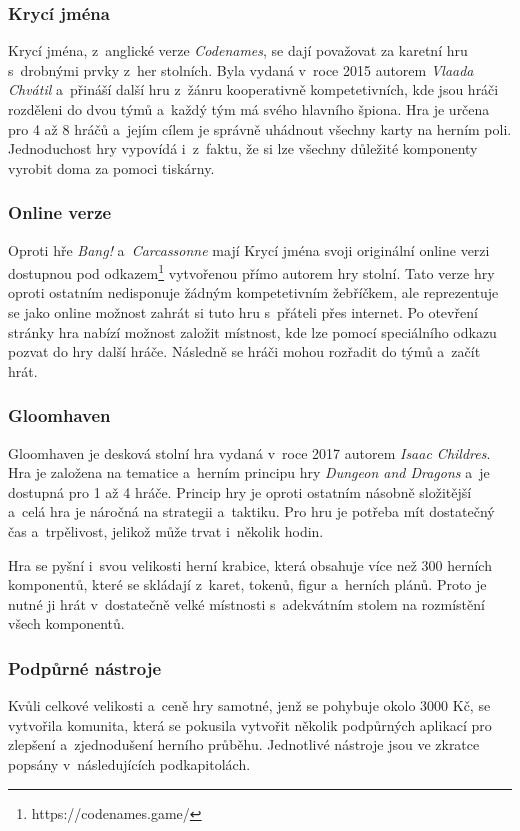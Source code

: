 \subsubsection{Krycí jména}
\label{subsubsec:popular-board-games-analysis-codenames}
Krycí jména, z~anglické verze \textit{Codenames}, se dají považovat za karetní hru s~drobnými prvky z~her stolních. Byla vydaná v~roce 2015 autorem \textit{Vlaada Chvátil} a~přináší další hru z~žánru kooperativně kompetetivních, kde jsou hráči rozděleni do dvou týmů a~každý tým má svého hlavního špiona. Hra je určena pro 4 až 8 hráčů a~jejím cílem je správně uhádnout všechny karty na herním poli. Jednoduchost hry vypovídá i~z~faktu, že si lze všechny důležité komponenty vyrobit doma za pomoci tiskárny.

\subsubsection*{Online verze}
\label{subsubsec:popular-board-games-analysis-codenames-online}
Oproti hře \textit{Bang!} a~\textit{Carcassonne} mají Krycí jména svoji originální online verzi dostupnou pod odkazem\footnote{https://codenames.game/} vytvořenou přímo autorem hry stolní. Tato verze hry oproti ostatním nedisponuje žádným kompetetivním žebříčkem, ale reprezentuje se jako online možnost zahrát si tuto hru s~přáteli přes internet. Po otevření stránky hra nabízí možnost založit místnost, kde lze pomocí speciálního odkazu pozvat do hry další hráče. Následně se hráči mohou rozřadit do týmů a~začít hrát.

\subsubsection{Gloomhaven}
\label{subsubsec:popular-board-games-analysis-gloomhaven}
Gloomhaven je desková stolní hra vydaná v~roce 2017 autorem \textit{Isaac Childres}. Hra je založena na tematice a~herním principu hry \textit{Dungeon and Dragons} a~je dostupná pro 1 až 4 hráče. Princip hry je oproti ostatním násobně složitější a~celá hra je náročná na strategii a~taktiku. Pro hru je potřeba mít dostatečný čas a~trpělivost, jelikož může trvat i~několik hodin.

Hra se pyšní i~svou velikosti herní krabice, která obsahuje více než 300 herních komponentů, které se skládají z~karet, tokenů, figur a~herních plánů. Proto je nutné ji hrát v~dostatečně velké místnosti s~adekvátním stolem na rozmístění všech komponentů.

\subsubsection*{Podpůrné nástroje}
\label{subsubsec:popular-board-games-analysis-gloomhaven-support-tools}
Kvůli celkové velikosti a~ceně hry samotné, jenž se pohybuje okolo 3000 Kč, se vytvořila komunita, která se pokusila vytvořit několik podpůrných aplikací pro zlepšení a~zjednodušení herního průběhu. Jednotlivé nástroje jsou ve zkratce popsány v~následujících podkapitolách.

